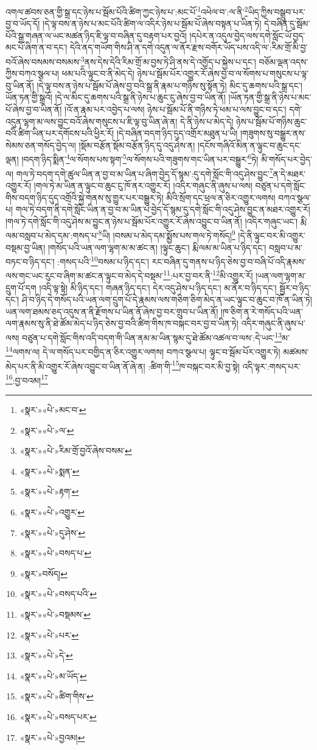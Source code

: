 འགལ་ཚབས་ཅན་གྱི་སྒྲ་དང་ཉེས་པ་སྦོམ་པོའི་ཚིག་ཀྱང་ཉེས་པ་:མང་པོ་\footnote{«སྣར་»«པེ་»མང་བ་}འཕེལ་བ་:ལ་ནི་\footnote{«སྣར་»«པེ་»ལ་}ཡིད་ཀྱིས་བསྒྲུབ་པར་བྱ་བ་ཡོད་དོ། །དེ་ལྟ་བས་ན་ཉེས་པ་མང་པོའི་ཚིག་ལ་འདིར་ཉེས་པ་སྦོམ་པོ་ཞེས་བསྟན་པ་ཡིན་ཏེ། དེ་བཞིན་དུ་སྦོམ་པོའི་སྒྲ་གཞན་ལ་ཡང་མཚན་ཉིད་ཇི་ལྟ་བ་བཞིན་དུ་བརྟག་པར་བྱའོ། །དཔེར་ན་འདུལ་བྱེད་ལས་དགེ་སློང་ཡོ་བྱད་མང་པོ་ཞིག་ན་བ་དང་། དེའི་ནད་གཡོག་གིས་ཤི་ན་དགེ་འདུན་ལ་ནོར་རྫས་བགོར་ཡོད་པས་འདི་ལ་:རིམ་གྲོ་མི་བྱ་བའོ་ཞེས་བསམས་བསམས་\footnote{«སྣར་»«པེ་»རིམ་གྲོ་བྱའོ་ཞེས་བསམ་}ནས་དེས་དེའི་རིམ་གྲོ་མ་བྱས་ཏེ་ཤི་ནས་དེ་འགྱོད་པ་སྐྱེས་པ་དང་། བཅོམ་ལྡན་འདས་ཀྱིས་བཀའ་སྩལ་པ། ཕམ་པའི་ལྟུང་བ་ནི་མེད་དེ། ཉེས་པ་སྦོམ་པོར་འགྱུར་རོ་ཞེས་བྱ་བ་ལ་སོགས་པ་གསུངས་པ་ལྟ་བུ་ཡིན་ནོ། །དེ་ལྟ་བས་ན་ཉེས་པ་སྦོམ་པོ་ཞེས་བྱ་བའི་སྒྲ་ནི་རྣམ་པ་གཉིས་སུ་སྟོན་ཏེ། མིང་དུ་ཆགས་པའི་སྒྲ་དང་། ཡོན་ཏན་གྱི་སྒྲའོ། །དེ་ལ་མིང་དུ་ཆགས་པའི་སྒྲ་ནི་ཉེས་པ་ཆུང་ངུ་ཞེས་བྱ་བ་ཡིན་ནོ། །ཡོན་ཏན་གྱི་སྒྲ་ནི་ཉེས་པ་མང་པོ་ཞེས་བྱ་བ་ཡིན་ནོ། །འོ་ན་རྣམ་པར་འབྱེད་པ་ལས། ཉེས་པ་སྦོམ་པོ་ནི་གཉིས་ཏེ་ཕམ་པ་ལས་བྱུང་བ་དང་། དགེ་འདུན་ལྷག་མ་ལས་བྱུང་བའོ་ཞེས་གསུངས་པ་ཇི་ལྟ་བུ་ཡིན་ཞེ་ན། དེ་ནི་ཉེས་པ་མེད་དེ། ཉེས་པ་སྦོམ་པོ་གཉིས་ཆུང་བའི་ཚིག་ཡིན་པར་དགོངས་པའི་ཕྱིར་རོ། །དེ་བཞིན་བདག་ཉིད་དུད་འགྲོར་མཐུན་པ་ཡི། །གཟུགས་སུ་བསྒྱུར་ནས་སེམས་ཅན་གསོད་བྱེད་ལ། །སྡོམ་བརྩོན་སྡོམ་བརྩོན་ཉིད་དུ་འདུ་ཤེས་ན། །དངོས་གཞིའོ་མིན་ན་ལྟུང་བ་ཆུང་དང་ལྡན། །བདག་ཉིད་སྨིན་\footnote{«སྣར་»«པེ་»སྨན་}ལ་སོགས་པས་སྟག་\footnote{«སྣར་»«པེ་»རྟག་}ལ་སོགས་པའི་གཟུགས་གང་ཡིན་པར་བསྒྱུར་\footnote{«སྣར་»«པེ་»འགྱུར་}ཏེ། མི་གསོད་པར་བྱེད་ལ། གལ་ཏེ་བདག་དགེ་ཚུལ་ཡིན་ན་བྱ་བ་མ་ཡིན་པ་ཞིག་བྱེད་དོ་སྙམ་:དུ་དགེ་སློང་གི་འདུ་ཤེས་བྱུང་\footnote{«སྣར་»«པེ་»དུ་ཤེས་}ན་དེ་མཐར་འགྱུར་རོ། །གལ་ཏེ་མ་ཡིན་ན་ལྟུང་བ་ཆུང་ངུ་ཁོ་ནར་འགྱུར་རོ། །འདིར་གཞུང་ནི་ཞུས་པ་ལས། བཙུན་པ་དགེ་སློང་གིས་བདག་ཉིད་དུད་འགྲོའི་སྐྱེ་གནས་སུ་གྱུར་པར་བསྒྱུར་ཏེ། མིའི་སྲོག་དང་ཕྲལ་ན་ཅིར་འགྱུར་ལགས། བཀའ་སྩལ་པ། གལ་ཏེ་བདག་ནི་དགེ་སློང་ཡིན་ན་བྱ་བ་མ་ཡིན་པ་བྱེད་དོ་སྙམ་དུ་དགེ་སློང་གི་འདུ་ཤེས་བྱུང་ན་མཐར་འགྱུར་རོ། །གལ་ཏེ་དགེ་སློང་གི་འདུ་ཤེས་མ་བྱུང་ན་ཉེས་པ་སྦོམ་པོར་འགྱུར་རོ་ཞེས་འབྱུང་བ་ཡིན་ནོ། །འདིར་གཞུང་ཡང་། རྨི་ལམ་བསླབ་པ་མེད་དམ་:གསད་པ་\footnote{«སྣར་»«པེ་»བསད་པ་}ཡི། །བསམ་པ་མེད་དམ་སྨྱོས་པས་གལ་ཏེ་གསོད།\footnote{«སྣར་»བསོད།} །དེ་ནི་ལྟུང་བར་མི་འགྱུར་བསྡམ་བྱ་ཡིན། །གསོད་པའི་ཡན་ལག་ལྷག་མ་མ་ཚང་ན། །ལྟུང་ཆུང་། རྨི་ལམ་མ་ཡིན་པ་ཉིད་དང་། བསླབ་པ་མ་བཏང་བ་ཉིད་དང་། :གསད་པའི་\footnote{«སྣར་»«པེ་»བསད་པའི་}བསམ་པ་ཉིད་དང་། རང་བཞིན་དུ་གནས་པ་ཉིད་ཅེས་བྱ་བ་བཞི་པོ་འདི་རྣམས་ལས་གང་ཡང་རུང་བ་ཞིག་མ་ཚང་ན་ལྟུང་བ་མེད་དེ་བསྡམ་\footnote{«སྣར་»«པེ་»བསྡམས་}:པར་བྱ་བར་ནི་\footnote{«སྣར་»«པེ་»པར་}མི་འགྱུར་རོ། །ཡན་ལག་ལྷག་མ་དྲུག་པོ་དག །འདི་ལྟ་སྟེ། མི་ཉིད་དང་། གཞན་ཉིད་དང་། དེར་འདུ་ཤེས་པ་ཉིད་དང་། མ་ནོར་བ་ཉིད་དང་། སྦྱོར་བ་ཉིད་དང་། ཤི་བ་ཉིད་དེ་གསོད་པའི་ཡན་ལག་དྲུག་པོ་དེ་རྣམས་ལས་གཅིག་ཅིག་མེད་ན་ཡང་ལྟུང་བ་ཆུང་བ་ཁོ་ན་ཡིན་ཏེ། ཡན་ལག་ཐམས་ཅད་འདུས་ན་ནི་རྫོགས་པ་ཡིན་ནོ་ཞེས་བྱ་བར་གྲུབ་པ་ཡིན་ནོ། །ཁ་ཅིག་ན་རེ་གསོད་པའི་ཡན་ལག་རྣམས་སུ་ནི་ཐེ་ཚོམ་མེད་པ་ཉིད་ཅེས་བྱ་བའི་ཚིག་གིས་ཁ་བསྐང་བར་བྱ་བ་ཡིན་ཏེ། འདིར་གཞུང་ནི་ཞུས་པ་ལས། བཙུན་པ་དགེ་སློང་གིས་འདི་བདག་གི་ཡིན་ནམ་མ་ཡིན་སྙམ་དུ་ཐེ་ཚོམ་འཚལ་བ་ལས་:དེ་ཡང་\footnote{«སྣར་»«པེ་»དེ་}མ་\footnote{«སྣར་»«པེ་»མ་ཡོད་}ལགས་ལ། དེ་ལ་གསོད་པར་བགྱིད་ན་ཅིར་འགྱུར་ལགས། བཀའ་སྩལ་པ། ལྟུང་བ་སྦོམ་པོར་འགྱུར་ཏེ། མཚམས་མེད་པར་ནི་མི་འགྱུར་རོ་ཞེས་འབྱུང་བ་ཡིན་ནོ་ཞེ་ན། :ཚིག་གི་\footnote{«སྣར་»«པེ་»ཚིག་གིས་}ཁ་བསྐང་བར་མི་བྱ་སྟེ། འདི་ལྟར་:གསད་པར་\footnote{«སྣར་»«པེ་»བསད་པར་}:བྱ་བའམ།\footnote{«སྣར་»«པེ་»བྱའམ།} 